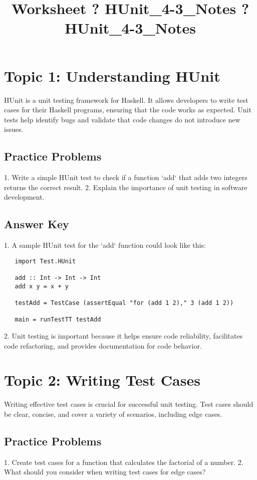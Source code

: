 \documentclass{article}
\title{Worksheet ? HUnit\_4-3\_Notes ? HUnit\_4-3\_Notes}
\author{}
\date{}
\begin{document}
\maketitle

\section*{Topic 1: Understanding HUnit}
HUnit is a unit testing framework for Haskell. It allows developers to write test cases for their Haskell programs, ensuring that the code works as expected. Unit tests help identify bugs and validate that code changes do not introduce new issues.

\subsection*{Practice Problems}
1. Write a simple HUnit test to check if a function `add` that adds two integers returns the correct result.
2. Explain the importance of unit testing in software development.

\subsection*{Answer Key}
1. A sample HUnit test for the `add` function could look like this:
   \begin{verbatim}
   import Test.HUnit

   add :: Int -> Int -> Int
   add x y = x + y

   testAdd = TestCase (assertEqual "for (add 1 2)," 3 (add 1 2))

   main = runTestTT testAdd
   \end{verbatim}
2. Unit testing is important because it helps ensure code reliability, facilitates code refactoring, and provides documentation for code behavior.

\section*{Topic 2: Writing Test Cases}
Writing effective test cases is crucial for successful unit testing. Test cases should be clear, concise, and cover a variety of scenarios, including edge cases.

\subsection*{Practice Problems}
1. Create test cases for a function that calculates the factorial of a number.
2. What should you consider when writing test cases for edge cases?
\end{document}
